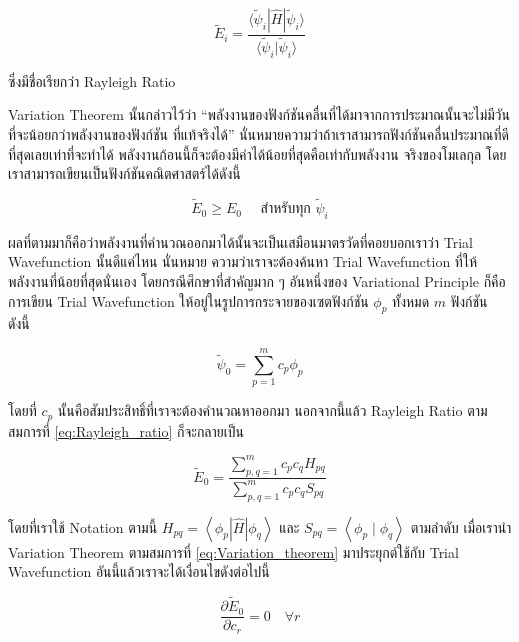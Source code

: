 \begin{equation}
  \label{eq:Rayleigh_ratio}
  \tilde{E}_i
  =
  \frac
  {
    \langle
    \tilde{\psi}_i | \hat{H} | \tilde{\psi}_i
    \rangle
  }
  {
    \langle
    \tilde{\psi}_i | \tilde{\psi}_i
    \rangle
  }
\end{equation}

\noindent ซึ่งมีชื่อเรียกว่า Rayleigh Ratio

Variation Theorem นั้นกล่าวไว้ว่า \enquote{พลังงานของฟังก์ชันคลื่นที่ได้มาจากการประมาณนั้นจะไม่มีวันที่จะน้อยกว่าพลังงานของฟังก์ชัน%
  ที่แท้จริงได้} นั่นหมายความว่าถ้าเราสามารถฟังก์ชันคลื่นประมาณที่ดีที่สุดเลยเท่าที่จะทำได้ พลังงานก้อนนี้ก็จะต้องมีค่าได้น้อยที่สุดคือเท่ากับพลังงาน%
จริงของโมเลกุล โดยเราสามารถเขียนเป็นฟังก์ชันคณิตศาสตร์ได้ดังนี้

\begin{equation}
  \label{eq:Variation_theorem}
  \tilde{E}_0 \geq E_0 \quad \text{ สำหรับทุก } \tilde{\psi}_i
\end{equation}

\noindent ผลที่ตามมาก็คือว่าพลังงานที่คำนวณออกมาได้นั้นจะเป็นเสมือนมาตรวัดที่คอยบอกเราว่า Trial Wavefunction นั้นดีแค่ไหน นั่นหมาย%
ความว่าเราจะต้องค้นหา Trial Wavefunction ที่ให้พลังงานที่น้อยที่สุดนั่นเอง โดยกรณีศึกษาที่สำคัญมาก ๆ อันหนึ่งของ Variational Principle
ก็คือการเขียน Trial Wavefunction ให้อยู่ในรูปการกระจายของเซตฟังก์ชัน $\phi_p$ ทั้งหมด $m$ ฟังก์ชัน ดังนี้

\begin{equation}
  \tilde{\psi}_0 = \sum_{p=1}^m c_p \phi_p
\end{equation}

\noindent โดยที่ $c_p$ นั้นคือสัมประสิทธิ์ที่เราจะต้องคำนวณหาออกมา นอกจากนี้แล้ว Rayleigh Ratio ตามสมการที่ \eqref{eq:Rayleigh_ratio}
ก็จะกลายเป็น

\begin{equation}
  \tilde{E}_0
  =
  \frac
  {
    \sum_{p, q=1}^m c_p c_q H_{p q}
  }
  {
    \sum_{p, q=1}^m c_p c_q S_{p q}
  }
\end{equation}

\noindent โดยที่เราใช้ Notation ตามนี้ $H_{p q}=\left\langle\phi_p|\hat{H}| \phi_q\right\rangle$ และ
$S_{p q}=\left\langle\phi_p \mid \phi_q\right\rangle$ ตามลำดับ เมื่อเรานำ Variation Theorem ตามสมการที่
\eqref{eq:Variation_theorem} มาประยุกต์ใช้กับ Trial Wavefunction อันนี้แล้วเราจะได้เงื่อนไขดังต่อไปนี้

\begin{equation}
  \frac
  {
    \partial \tilde{E}_0
  }
  {
    \partial c_r
  }
  =
  0 \quad \forall r
\end{equation}

